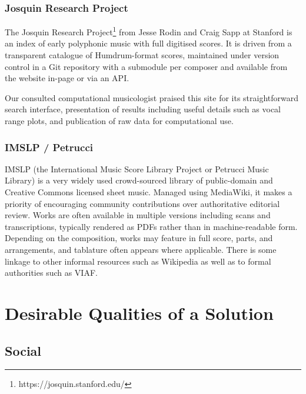 \documentclass[sigconf]{acmart}
\begin{document}
\begin{sloppypar}
  \subsubsection{Josquin Research Project}

  The Josquin Research Project\footnote{https://josquin.stanford.edu/}
  from Jesse Rodin and Craig Sapp at Stanford is an index of early
  polyphonic music with full digitised scores. It is driven from a
  transparent catalogue of Humdrum-format scores, maintained under
  version control in a Git repository with a submodule per composer
  and available from the website in-page or via an API.

  Our consulted computational musicologist praised this site for its
  straightforward search interface, presentation of results including
  useful details such as vocal range plots, and publication of raw
  data for computational use.
  
  \subsubsection{IMSLP / Petrucci}

  IMSLP (the International Music Score Library Project or Petrucci
  Music Library) is a very widely used crowd-sourced library of
  public-domain and Creative Commons licensed sheet music. Managed
  using MediaWiki, it makes a priority of encouraging community
  contributions over authoritative editorial review. Works are often
  available in multiple versions including scans and transcriptions,
  typically rendered as PDFs rather than in machine-readable
  form. Depending on the composition, works may feature in full score,
  parts, and arrangements, and tablature often appears where
  applicable. There is some linkage to other informal resources such
  as Wikipedia as well as to formal authorities such as VIAF.
  
  \section{Desirable Qualities of a Solution}
  \subsection{Social}


\end{sloppypar}
\end{document}
